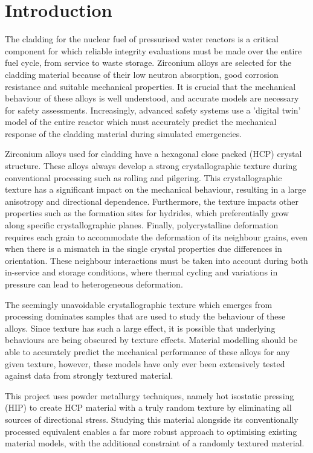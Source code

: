\chapter{Introduction}

The cladding for the nuclear fuel of pressurised water reactors is a critical component for which reliable integrity evaluations must be made over the entire fuel cycle, from service to waste storage.
Zirconium alloys are selected for the cladding material because of their low neutron absorption, good corrosion resistance and suitable mechanical properties.
It is crucial that the mechanical behaviour of these alloys is well understood, and accurate models are necessary for safety assessments.
Increasingly, advanced safety systems use a 'digital twin' model of the entire reactor which must accurately predict the mechanical response of the cladding material during simulated emergencies.

Zirconium alloys used for cladding have a hexagonal close packed (HCP) crystal structure.
These alloys always develop a strong crystallographic texture during conventional processing such as rolling and pilgering.
This crystallographic texture has a significant impact on the mechanical behaviour, resulting in a large anisotropy and directional dependence.
Furthermore, the texture impacts other properties such as the formation sites for hydrides, which preferentially grow along specific crystallographic planes.
Finally, polycrystalline deformation requires each grain to accommodate the deformation of its neighbour grains, even when there is a mismatch in the single crystal properties due differences in orientation.
These neighbour interactions must be taken into account during both in-service and storage conditions, where thermal cycling and variations in pressure can lead to heterogeneous deformation.

The seemingly unavoidable crystallographic texture which emerges from processing dominates samples that are used to study the behaviour of these alloys.
Since texture has such a large effect, it is possible that underlying behaviours are being obscured by texture effects.
Material modelling should be able to accurately predict the mechanical performance of these alloys for any given texture, however, these models have only ever been extensively tested against data from strongly textured material.

This project uses powder metallurgy techniques, namely hot isostatic pressing (HIP) to create HCP material with a truly random texture by eliminating all sources of directional stress.
Studying this material alongside its conventionally processed equivalent enables a far more robust approach to optimising existing material models, with the additional constraint of a randomly textured material.

